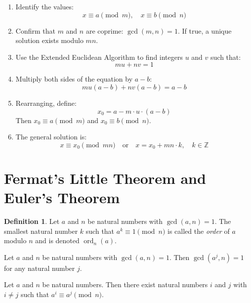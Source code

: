\documentclass{article}
\theoremstyle{definition}
\newtheorem*{definition*}{Definition}
\newenvironment{manualtheorem}[1]{%
  \renewcommand{\thetheorem}{#1}%
  \theorem%
}{%
  \endtheorem%
}
\begin{document}
\begin{enumerate}
	\item Identify the values:
	      \[
		      x \equiv a \pmod{m}, \quad x \equiv b \pmod{n}
	      \]

	\item Confirm that \( m \) and \( n \) are coprime: \( \gcd(m, n) = 1 \). If true, a unique solution exists modulo \( mn \).

	\item Use the Extended Euclidean Algorithm to find integers \( u \) and \( v \) such that:
	      \[
		      mu + nv = 1
	      \]

	\item Multiply both sides of the equation by \( a - b \):
	      \[
		      m u (a - b) + n v (a - b) = a - b
	      \]

	\item Rearranging, define:
	      \[
		      x_0 = a - m \cdot u \cdot (a - b)
	      \]
	      Then \( x_0 \equiv a \pmod{m} \) and \( x_0 \equiv b \pmod{n} \).

	\item The general solution is:
	      \[
		      x \equiv x_0 \pmod{mn}
		      \quad \text{or} \quad
		      x = x_0 + mn \cdot k, \quad k \in \mathbb{Z}
	      \]
\end{enumerate}

\section{Fermat’s Little Theorem and Euler’s Theorem}

\begin{definition*}
	Let $a$ and $n$ be natural numbers with $\gcd(a,n) = 1$. The smallest natural number $k$ such that $a^{k} \equiv 1 \pmod{n}$ is called the \emph{order} of $a$ modulo $n$ and is denoted $\operatorname{ord}_{n}(a)$.
\end{definition*}

\begin{manualtheorem}{4.2}
	Let $a$ and $n$ be natural numbers with $\gcd(a,n) = 1$. Then $\gcd(a^{j}, n) = 1$ for any natural number $j$.
\end{manualtheorem}

\begin{manualtheorem}{4.4}
	Let $a$ and $n$ be natural numbers. Then there exist natural numbers $i$ and $j$ with $i \ne j$ such that $a^{i} \equiv a^{j} \pmod{n}$.
\end{manualtheorem}
\end{document}
